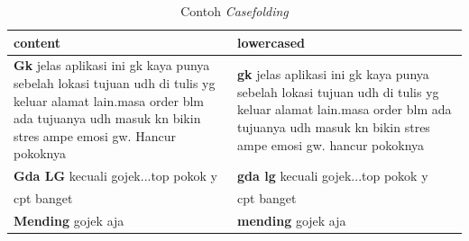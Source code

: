\begin{enumerate}
\begin{enumerate}
    \begin{table}[H]
      \centering
      \caption{Contoh \emph{Casefolding}}
      \label{tab:contoh_casefolding}
      \begin{tabularx}{\columnwidth}{|X|X|}
        \hline
        content                                                                                                                                                                                      & lowercased                                                                                                                                                                                   \\ \hline
        {\bfseries Gk} jelas aplikasi ini gk kaya punya sebelah lokasi tujuan udh di tulis yg keluar alamat lain.masa order blm ada tujuanya udh masuk kn bikin stres ampe emosi gw. Hancur pokoknya & {\bfseries gk} jelas aplikasi ini gk kaya punya sebelah lokasi tujuan udh di tulis yg keluar alamat lain.masa order blm ada tujuanya udh masuk kn bikin stres ampe emosi gw. hancur pokoknya \\ \hline
        {\bfseries Gda LG} kecuali gojek...top pokok y                                                                                                                                               & {\bfseries gda lg} kecuali gojek...top pokok y                                                                                                                                               \\ \hline
        cpt banget                                                                                                                                                                                   & cpt banget                                                                                                                                                                                   \\ \hline
        {\bfseries Mending} gojek aja                                                                                                                                                                & {\bfseries mending} gojek aja                                                                                                                                                                \\ \hline
      \end{tabularx}
    \end{table}


\end{enumerate}
\end{enumerate}
